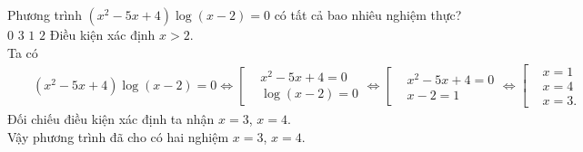 \begin{ex}%
 Phương trình $(x^2-5x+4)\log(x-2)=0$ có tất cả bao nhiêu nghiệm thực?
 \choice
  {$0$}
  {$3$}
  {$1$}
  {\True $2$}
 \loigiai
  {
  Điều kiện xác định $x>2$.\\
  Ta có
  \begin{eqnarray*}
   & & (x^2-5x+4)\log(x-2)=0 \Leftrightarrow \left[\begin{aligned} & x^2-5x+4=0 \\& \log (x-2) = 0\end{aligned}\right. \Leftrightarrow \left[\begin{aligned} & x^2-5x+4=0 \\& x-2=1\end{aligned}\right. \Leftrightarrow \left[\begin{aligned} & x=1 \\& x=4 \\& x=3.\end{aligned}\right.
  \end{eqnarray*}
  Đối chiếu điều kiện xác định ta nhận $x=3$, $x=4$.\\
  Vậy phương trình đã cho có hai nghiệm $x=3$, $x=4$.
  }
\end{ex}


